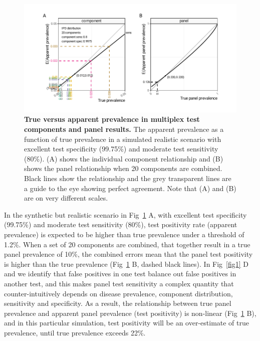 \documentclass[10pt,letterpaper]{article}
\begin{document}
\begin{figure}[h!]
\centerline{\includegraphics{fig/true-apparent-prevalence-component-panels.pdf}}
\caption{{\bf True versus apparent prevalence in multiplex test components and panel results.}
The apparent prevalence as a function of true prevalence in a simulated realistic scenario with excellent test specificity (99.75\%) and moderate test sensitivity (80\%). (A) shows the individual component relationship and (B) shows the panel relationship when 20 components are combined. Black lines show the relationship and the grey transparent lines are a guide to the eye showing perfect agreement. Note that (A) and (B) are on very different scales.
}
\label{fig3}
\end{figure}

In the synthetic but realistic scenario in Fig~\ref{fig3} A, with excellent test specificity (99.75\%) and moderate test sensitivity (80\%), test positivity rate (apparent prevalence) is expected to be higher than true prevalence under a threshold of 1.2\%. When a set of 20 components are combined, that together result in a true panel prevalence of 10\%, the combined errors mean that the panel test positivity is higher than the true prevalence (Fig~\ref{fig3} B, dashed black lines). In Fig~\ref{fig1} D and  we identify that false positives in one test balance out false positives in another test, and this makes panel test sensitivity a complex quantity that counter-intuitively depends on disease prevalence, component distribution, sensitivity and specificity. As a result, the relationship between true panel prevalence and apparent panel prevalence (test positivity) is non-linear (Fig~\ref{fig3} B), and in this particular simulation, test positivity will be an over-estimate of true prevalence, until true prevalence exceeds 22\%.
\end{document}
